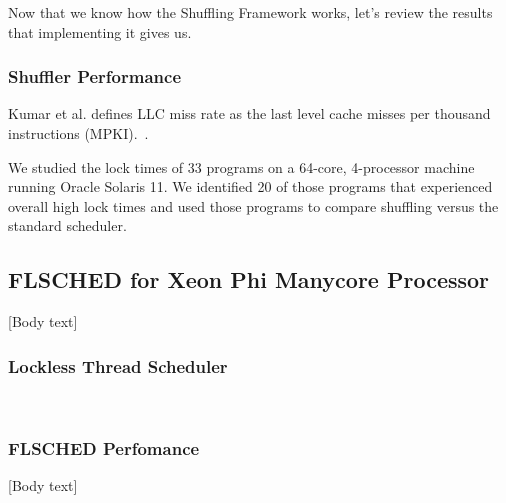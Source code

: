 \documentclass{sig-alternate}
\begin{document}
Now that we know how the Shuffling Framework works, let's review the results that implementing it gives us.

\subsubsection{Shuffler Performance}
\label{sec:shuf_performance}

Kumar et al. defines LLC miss rate as the last level cache misses per thousand instructions (MPKI).~\cite{KumarEtal:2014}.

We studied the lock times of 33 programs on a 64-core, 4-processor machine running Oracle Solaris 11. We identified 20 of those programs that experienced overall high lock times and used those programs to compare shuffling versus the standard scheduler.~\cite{KumarEtal:2014}



\subsection{FLSCHED for Xeon Phi Manycore Processor}
\label{sec:flsched}



[Body text]

\subsubsection{Lockless Thread Scheduler}
\label{sec:flsched_about}

\cite{Lozi:2016, HeeseungEtal:2017}
~\cite{KumarEtal:2014}

\subsubsection{FLSCHED Perfomance}
\label{sec:flsched_performance}

[Body text]
\end{document}
